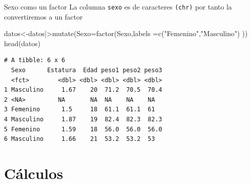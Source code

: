 \documentclass[
  ignorenonframetext,
  aspectratio=169,
  spanish,
]{beamer}
\newenvironment{Shaded}{\begin{snugshade}}{\end{snugshade}}
\newcommand{\AttributeTok}[1]{\textcolor[rgb]{0.40,0.45,0.13}{#1}}
\newcommand{\FunctionTok}[1]{\textcolor[rgb]{0.28,0.35,0.67}{#1}}
\newcommand{\NormalTok}[1]{\textcolor[rgb]{0.00,0.23,0.31}{#1}}
\newcommand{\OtherTok}[1]{\textcolor[rgb]{0.00,0.23,0.31}{#1}}
\newcommand{\SpecialCharTok}[1]{\textcolor[rgb]{0.37,0.37,0.37}{#1}}
\newcommand{\StringTok}[1]{\textcolor[rgb]{0.13,0.47,0.30}{#1}}
\begin{document}
\begin{frame}[fragile]{Sexo como un factor}
\label{sexo-como-un-factor}
La columna \texttt{sexo} es de caracteres \texttt{(chr)} por tanto la
convertiremos a un factor

\begin{Shaded}
\begin{Highlighting}[]
\NormalTok{datos}\OtherTok{\textless{}{-}}\NormalTok{datos}\SpecialCharTok{|\textgreater{}}\FunctionTok{mutate}\NormalTok{(}\AttributeTok{Sexo=}\FunctionTok{factor}\NormalTok{(Sexo,labels}
          \OtherTok{=}\FunctionTok{c}\NormalTok{(}\StringTok{"Femenino"}\NormalTok{,}\StringTok{"Masculino"}\NormalTok{) ))}
\FunctionTok{head}\NormalTok{(datos)}
\end{Highlighting}
\end{Shaded}

\begin{verbatim}
# A tibble: 6 x 6
  Sexo      Estatura  Edad peso1 peso2 peso3
  <fct>        <dbl> <dbl> <dbl> <dbl> <dbl>
1 Masculino     1.67    20  71.2  70.5  70.4
2 <NA>         NA       NA  NA    NA    NA  
3 Femenino      1.5     18  61.1  61.1  61  
4 Masculino     1.87    19  82.4  82.3  82.3
5 Femenino      1.59    18  56.0  56.0  56.0
6 Masculino     1.66    21  53.2  53.2  53  
\end{verbatim}
\end{frame}

\section{Cálculos}\label{cuxe1lculos}
\end{document}

